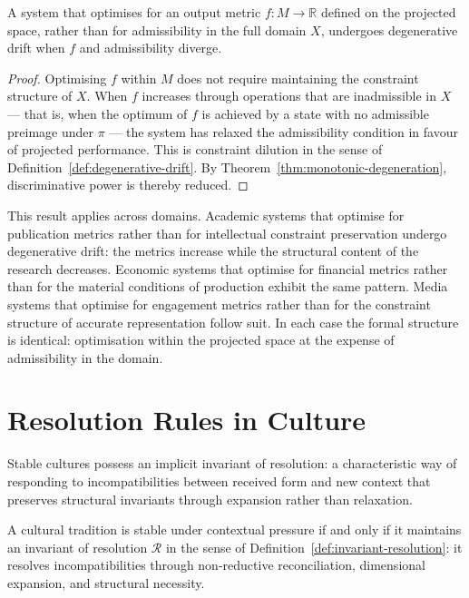 \documentclass[11pt,openany]{book}
\begin{document}
\begin{proposition}
\label{prop:metric-optimisation}
A system that optimises for an output metric $f : M \to
\mathbb{R}$ defined on the projected space, rather than for
admissibility in the full domain $X$, undergoes degenerative
drift when $f$ and admissibility diverge.
\end{proposition}

\begin{proof}
Optimising $f$ within $M$ does not require maintaining the
constraint structure of $X$.  When $f$ increases through
operations that are inadmissible in $X$ — that is, when the
optimum of $f$ is achieved by a state with no admissible
preimage under $\pi$ — the system has relaxed the
admissibility condition in favour of projected performance.
This is constraint dilution in the sense of
Definition~\ref{def:degenerative-drift}.  By
Theorem~\ref{thm:monotonic-degeneration}, discriminative
power is thereby reduced.
\end{proof}

This result applies across domains.  Academic systems that
optimise for publication metrics rather than for
intellectual constraint preservation undergo degenerative
drift: the metrics increase while the structural content of
the research decreases.  Economic systems that optimise for
financial metrics rather than for the material conditions
of production exhibit the same pattern.  Media systems that
optimise for engagement metrics rather than for the
constraint structure of accurate representation follow
suit.  In each case the formal structure is identical:
optimisation within the projected space at the expense of
admissibility in the domain.

\section{Resolution Rules in Culture}
\label{sec:resolution-culture}

Stable cultures possess an implicit invariant of resolution:
a characteristic way of responding to incompatibilities
between received form and new context that preserves
structural invariants through expansion rather than
relaxation.

\begin{proposition}
\label{prop:cultural-stability}
A cultural tradition is stable under contextual pressure if
and only if it maintains an invariant of resolution
$\mathcal{R}$ in the sense of
Definition~\ref{def:invariant-resolution}: it resolves
incompatibilities through non-reductive reconciliation,
dimensional expansion, and structural necessity.
\end{proposition}
\end{document}
